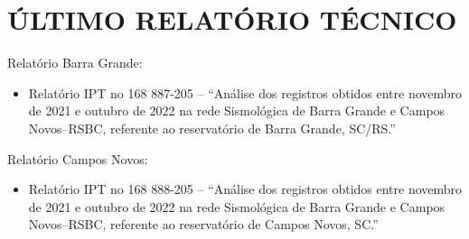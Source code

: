 \section{ÚLTIMO RELATÓRIO TÉCNICO}
\label{section:ultimo_relatorio}
Relatório Barra Grande:

\begin{itemize}
\item Relatório IPT no 168 887-205 – “Análise dos registros obtidos entre novembro de 2021 e outubro de 2022 na rede Sismológica de Barra Grande e Campos Novos–RSBC, referente ao reservatório de Barra Grande, SC/RS.”
\end{itemize}

Relatório Campos Novos:
\begin{itemize}
    \item Relatório IPT no 168 888-205 – “Análise dos registros obtidos entre novembro de 2021 e outubro de 2022 na rede Sismológica de Barra Grande e Campos Novos–RSBC, referente ao reservatório de Campos Novos, SC.”
\end{itemize}
